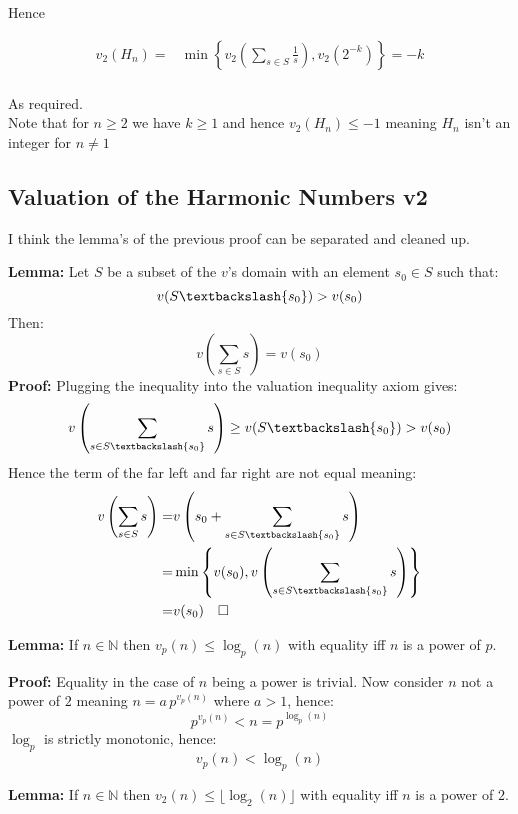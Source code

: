 Hence

\begin{equation*}
\begin{aligned}
	v_2(H_n) =& \min\left\{ v_2\left(\sum_{s\in S}\frac{1}{s}\right) , v_2(2^{-k})\right\} = -k\\
\end{aligned}
\end{equation*}

As required.
\\

Note that for $n \geq 2$ we have $k \geq 1$ and hence $v_2(H_n) \leq -1$ meaning $H_n$ isn't an integer for $n\neq1$

\subsection{Valuation of the Harmonic Numbers v2}
I think the lemma's of the previous proof can be separated and cleaned up.

{\textbf{Lemma:}} Let $S$ be a subset of the $v$'s domain with an element $s_0\in S$ such that:
\[v(S\textbackslash\{s_0\}) > v(s_0)\]
Then:
\[v\left(\sum_{s\in S}s\right) = v(s_0)\]
{\textbf{Proof:}} Plugging the inequality into the valuation inequality axiom gives:
\[ v\left(\sum_{s\in S\textbackslash\{s_0\}}s\right) \geq v(S\textbackslash\{s_0\}) > v(s_0)\]
Hence the term of the far left and far right are not equal meaning:
\begin{equation*}
\begin{aligned}
	v\left(\sum_{s\in S}s\right) =& v\left(s_0+\sum_{s\in S\textbackslash\{s_0\}}s\right) \\
	=& \min\left\{v(s_0),v\left(\sum_{s\in S\textbackslash\{s_0\}}s\right)\right\} \\
	=&v(s_0)\quad \square\\
\end{aligned}
\end{equation*}

{\textbf{Lemma:}} If $n \in \mathbb{N}$ then $v_p(n) \leq \log_p(n)$ with equality iff $n$ is a power of $p$.

{\textbf{Proof:}} Equality in the case of $n$ being a power is trivial.
Now consider $n$ not a power of $2$ meaning $n = a\,p^{v_p(n)}$ where $a > 1$, hence:
\[p^{v_p(n)} <  n = p^{\log_p(n)} \]
$\log_p$ is strictly monotonic, hence:
\[{v_p(n)} < {\log_p(n)} \]

{\textbf{Lemma:}} If $n \in \mathbb{N}$ then $v_2(n) \leq \lfloor \log_2 (n) \rfloor$ with equality iff $n$ is a power of $2$.

